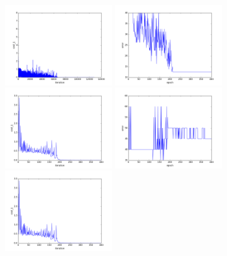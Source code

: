 \begin{figure}[htb]
\centering
\includegraphics[width=0.42\textwidth]{images/redes/ejecucion1/general_svm_frav/cost.png}
\includegraphics[width=0.42\textwidth]{images/redes/ejecucion1/general_svm_frav/error.png}
\includegraphics[width=0.42\textwidth]{images/redes/ejecucion1/general_svm_frav/minidataset/cost.png}
\includegraphics[width=0.42\textwidth]{images/redes/ejecucion1/general_svm_frav/minidataset/error.png}
\includegraphics[width=0.42\textwidth]{images/redes/ejecucion1/general_svm_frav/minidataset_tested_itself/cost.png}

\end{figure}
